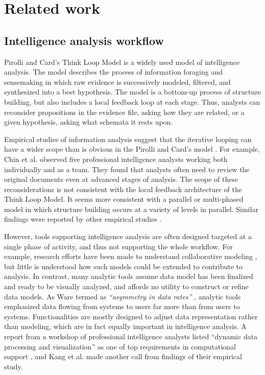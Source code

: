 \section{Related work}\label{related-work}

\subsection{Intelligence analysis workflow}

Pirolli and Card's Think Loop Model \cite{Pirolli2005} is a widely used model of intelligence analysis. The model describes the process of information foraging and sensemaking in which raw evidence is successively modeled, filtered, and synthesized into a best hypothesis. The model is a bottom-up process of structure building, but also includes a local feedback loop at each stage. Thus, analysts can reconsider propositions in the evidence file, asking how they are related, or a given hypothesis, asking what schemata it rests upon.

Empirical studies of information analysis suggest that the iterative looping can have a wider scope than is obvious in the Pirolli and Card's model \cite{Pirolli2005}. For example, Chin et al. \cite{Chin2009} observed five professional intelligence analysts working both individually and as a team. They found that analysts often need to review the original documents even at advanced stages of analysis. The scope of these reconsiderations is not consistent with the local feedback architecture of the Think Loop Model. It seems more consistent with a parallel or multi-phased model \cite{Wheaton2011} in which structure building occurs at a variety of levels in parallel. Similar findings were reported by other empirical studies \cite{Isenberg2008b,Kang2011,Herrmann2013a}.

However, tools supporting intelligence analysis are often designed targeted at a single phase of activity, and thus not supporting the whole workflow. For example, research efforts have been made to understand collaborative modeling \cite{Prilla2013}, but little is understood how such models could be extended to contribute to analysis.  In contrast, many analytic tools assume data model has been
finalized and ready to be visually analyzed, and affords no utility
to construct or refine data models. As Ware termed as \emph{``asymmetry in
data rates''} \cite[p.382]{Ware2012}, analytic tools emphasized data
flowing from systems to users far more than from users to systems.
Functionalities are mostly designed to adjust data representation
rather than modeling, which are in fact equally important in intelligence analysis. A report from a workshop of professional intelligence analysts listed ``dynamic data processing and visualization'' as one of top requirements in computational support \cite{Badalamente2005}, and Kang et al. \cite{Kang2011} made another call from findings of their empirical study.

